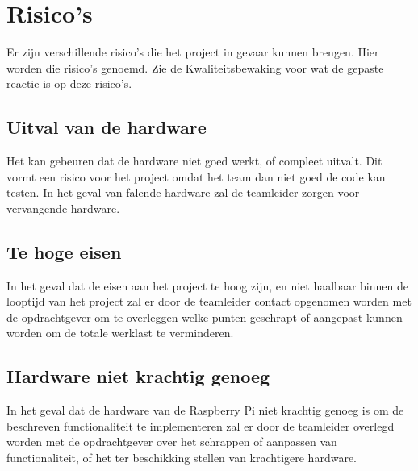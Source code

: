 \chapter{Risico's}
Er zijn verschillende risico's die het project in gevaar kunnen brengen. Hier worden die risico's genoemd.
Zie de Kwaliteitsbewaking voor wat de gepaste reactie is op deze risico's.

\section{Uitval van de hardware}
Het kan gebeuren dat de hardware niet goed werkt, of compleet uitvalt. Dit vormt een risico voor het project omdat het team dan niet goed de code kan testen. In het geval van falende hardware zal de teamleider zorgen voor vervangende hardware.

\section{Te hoge eisen}
In het geval dat de eisen aan het project te hoog zijn, en niet haalbaar binnen de looptijd van het project zal er door de teamleider contact opgenomen worden met de opdrachtgever om te overleggen welke punten geschrapt of aangepast kunnen worden om de totale werklast te verminderen.

\section{Hardware niet krachtig genoeg}
In het geval dat de hardware van de Raspberry Pi niet krachtig genoeg is om de beschreven functionaliteit te implementeren zal er door de teamleider overlegd worden met de opdrachtgever over het schrappen of aanpassen van functionaliteit, of het ter beschikking stellen van krachtigere hardware. 